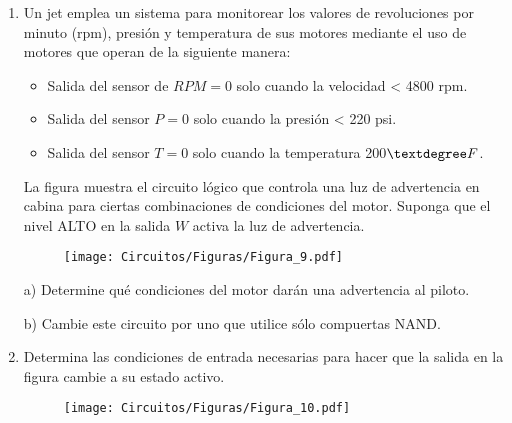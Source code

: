 \documentclass[a4paper, 12pt]{article}
\newcommand{\Aspace}{0.2cm}
\begin{document}
\begin{enumerate}
        \item Un jet emplea un sistema para monitorear los valores de revoluciones por minuto (rpm), presión y temperatura de sus motores mediante el uso de motores que operan de la siguiente manera:
        \begin{itemize}
            \item Salida del sensor de $RPM = 0$ solo cuando la velocidad < 4800 rpm.
            \item Salida del sensor $P = 0$ solo cuando la presión < 220 psi.
            \item Salida del sensor $T = 0$ solo cuando la temperatura 200$\textdegree F$.
        \end{itemize}
        La figura muestra el circuito lógico que controla una luz de advertencia en cabina para ciertas combinaciones de condiciones del motor. Suponga que el nivel ALTO en la salida $W$ activa la luz de advertencia.
        \begin{figure}[!ht]
            \centering
            \texttt{[image: Circuitos/Figuras/Figura\_9.pdf]}
        \end{figure}
            \vspace{\Aspace} \par
            a) Determine qué condiciones del motor darán una advertencia al piloto.
            \\ { \color{azul}  }

            \vspace{\Aspace} \par
            b) Cambie este circuito por uno que utilice sólo compuertas NAND.
            \\ { \color{azul}  }



        \item Determina las condiciones de entrada necesarias para hacer que la salida en la figura cambie a su estado activo.
        \begin{figure}[!ht]
            \centering
            \texttt{[image: Circuitos/Figuras/Figura\_10.pdf]}
        \end{figure}
            \vspace{\Aspace} \par
            { \color{azul}  }




\end{enumerate}
\end{document}

